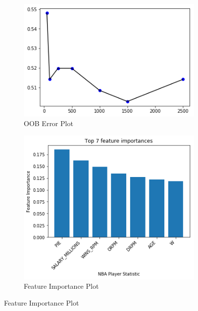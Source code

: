 \documentclass[11pt]{article}
\begin{document}
\begin{centering}
\begin{figure}[h]
  \begin{subfigure}[b]{0.4\textwidth}
    \includegraphics[width=\textwidth]{output_12_0.png}
    \caption{OOB Error Plot}
    \label{fig:1}
  \end{subfigure}
  \hfill
  \begin{subfigure}[b]{0.4\textwidth}
    \includegraphics[width=\textwidth]{output_13_0.png}
    \caption{Feature Importance Plot}
    \label{fig:1}
  \end{subfigure}
\end{figure}
\end{centering}
\end{document}
